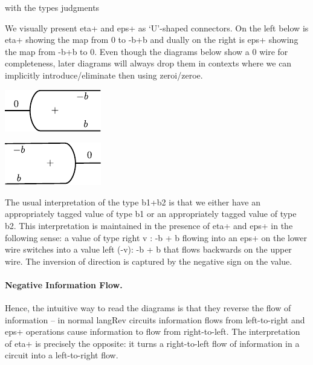 \documentclass[preprint]{sigplanconf}
\begin{document}
{\noindent
with the types judgments



We visually present {{eta+}} and {{eps+}} as `U'-shaped connectors. On
the left below is {{eta+}} showing the map from {{0}} to {{-b+b}} and
dually on the right is {{eps+}} showing the map from {{-b+b}} to
0. Even though the diagrams below show a {{0}} wire for completeness,
later diagrams will always drop them in contexts where we can
implicitly introduce/eliminate then using {{zeroi}}/{{zeroe}}.

\begin{multicols}{2}
\begin{center}
  \includegraphics{diagrams/eta.pdf}
\end{center}
  
\begin{center}
  \includegraphics{diagrams/eps.pdf}
\end{center}
\end{multicols}

The usual interpretation of the type {{b1+b2}} is that we either have
an appropriately tagged value of type {{b1}} or an appropriately
tagged value of type {{b2}}. This interpretation is maintained in the
presence of {{eta+}} and {{eps+}} in the following sense: a value of
type {{right v : -b + b}} flowing into an {{eps+}} on the lower wire
switches into a value {{left (-v): -b + b}} that flows backwards on the
upper wire. The inversion of direction is captured by the negative
sign on the value.

\paragraph*{Negative Information Flow.} 
Hence, the intuitive way to read the diagrams is that they reverse the
flow of information -- in normal {{langRev}} circuits information
flows from left-to-right and {{eps+}} operations cause information to
flow from right-to-left.  The interpretation of {{eta+}} is precisely
the opposite: it turns a right-to-left flow of information in a
circuit into a left-to-right flow.

}
\end{document}
